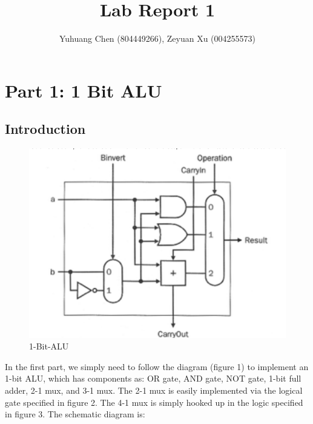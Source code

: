 \documentclass{article}
\title{Lab Report 1}
\author{Yuhuang Chen (804449266), Zeyuan Xu (004255573)}
\date{}
\begin{document}
  \maketitle%
  \thispagestyle{empty}

\section{Part 1: 1 Bit ALU}
\subsection{Introduction}
\begin{figure}[h]
  \centering
  \includegraphics[width=\linewidth]{1-Bit-ALU.png}
  \caption{1-Bit-ALU}
  \label{fig:1-ALU}
\end{figure}
In the first part, we simply need to follow the diagram (figure 1) to implement an 1-bit ALU, which has components as: OR gate, AND gate, NOT gate, 1-bit full adder, 2-1 mux, and 3-1 mux. The 2-1 mux is easily implemented via the logical gate specified in figure 2. The 4-1 mux is simply hooked up in the logic specified in figure 3. 
The schematic diagram is: 
\end{document}
